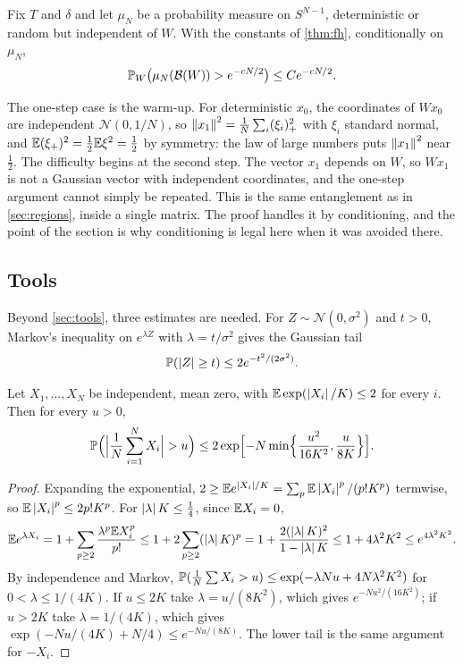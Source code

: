 \begin{theorem}\label{thm:fh-ae}
Fix $T$ and $\delta$ and let $\mu_N$ be a probability measure on $S^{N-1}$, deterministic or random but independent of $W$. With the constants of \cref{thm:fh}, conditionally on $\mu_N$,
\[
\mathbb{P}_W\bigl(\mu_N(\mathcal B(W))>e^{-cN/2}\bigr)\le Ce^{-cN/2}.
\]
\end{theorem}

The one-step case is the warm-up. For deterministic $x_0$, the coordinates of $Wx_0$ are independent $\mathcal N(0,1/N)$, so $\left\lVert x_1\right\rVert^2=\frac1N\sum_i(\xi_i)_+^2$ with $\xi_i$ standard normal, and $\mathbb{E}(\xi_+)^2=\tfrac12\mathbb{E}\xi^2=\tfrac12$ by symmetry: the law of large numbers puts $\left\lVert x_1\right\rVert^2$ near $\tfrac12$. The difficulty begins at the second step. The vector $x_1$ depends on $W$, so $Wx_1$ is not a Gaussian vector with independent coordinates, and the one-step argument cannot simply be repeated. This is the same entanglement as in \cref{sec:regions}, inside a single matrix. The proof handles it by conditioning, and the point of the section is why conditioning is legal here when it was avoided there.

\subsection{Tools}

Beyond \cref{sec:tools}, three estimates are needed. For $Z\sim\mathcal N(0,\sigma^2)$ and $t>0$, Markov's inequality on $e^{\lambda Z}$ with $\lambda=t/\sigma^2$ gives the Gaussian tail
\begin{equation}\label{eq:gtail}
\mathbb{P}(\left\lvert Z\right\rvert\ge t)\le2e^{-t^2/(2\sigma^2)}.
\end{equation}

\begin{lemma}\label{lem:bernstein}
Let $X_1,\dots,X_N$ be independent, mean zero, with $\mathbb{E}\exp(\left\lvert X_i\right\rvert/K)\le2$ for every $i$. Then for every $u>0$,
\[
\PP\Bigl(\Bigl|\frac1N\sum_{i=1}^NX_i\Bigr|>u\Bigr)\le2\exp\Bigl[-N\min\Bigl\{\frac{u^2}{16K^2},\frac u{8K}\Bigr\}\Bigr].
\]
\end{lemma}

\begin{proof}
Expanding the exponential, $2\ge\mathbb{E} e^{\left\lvert X_i\right\rvert/K}=\sum_p\mathbb{E}\left\lvert X_i\right\rvert^p/(p!K^p)$ termwise, so $\mathbb{E}\left\lvert X_i\right\rvert^p\le2p!K^p$. For $\left\lvert \lambda\right\rvert K\le\tfrac14$, since $\mathbb{E} X_i=0$,
\[
\mathbb{E} e^{\lambda X_i}=1+\sum_{p\ge2}\frac{\lambda^p\mathbb{E} X_i^p}{p!}\le1+2\sum_{p\ge2}(\left\lvert \lambda\right\rvert K)^p=1+\frac{2(\left\lvert \lambda\right\rvert K)^2}{1-\left\lvert \lambda\right\rvert K}\le1+4\lambda^2K^2\le e^{4\lambda^2K^2}.
\]
By independence and Markov, $\mathbb{P}(\frac1N\sum X_i>u)\le\exp(-\lambda Nu+4N\lambda^2K^2)$ for $0<\lambda\le1/(4K)$. If $u\le2K$ take $\lambda=u/(8K^2)$, which gives $e^{-Nu^2/(16K^2)}$; if $u>2K$ take $\lambda=1/(4K)$, which gives $\exp(-Nu/(4K)+N/4)\le e^{-Nu/(8K)}$. The lower tail is the same argument for $-X_i$.
\end{proof}


